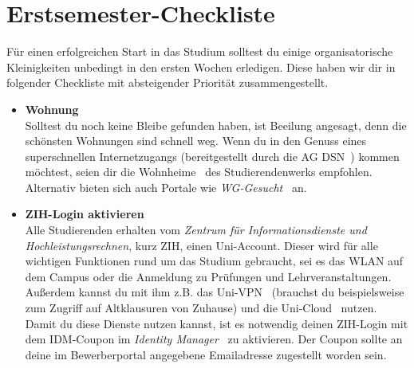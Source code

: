 \newcommand{\checkbox}[1]{\item[$\square$]\textbf{#1}\\}

\chapter*{Erstsemester-Checkliste}

Für einen erfolgreichen Start in das Studium solltest du einige organisatorische
Kleinigkeiten unbedingt in den ersten Wochen erledigen. Diese haben wir dir in
folgender Checkliste mit absteigender Priorität zusammengestellt.

\begin{itemize}[leftmargin=*]

\checkbox{Wohnung}
Solltest du noch keine Bleibe gefunden haben, ist Beeilung angesagt, denn die
schönsten Wohnungen sind schnell weg. Wenn du in den Genuss eines
superschnellen Internetzugangs (bereitgestellt durch die AG
DSN~) kommen möchtest, seien dir die
Wohnheime~
des Studierendenwerks empfohlen. Alternativ bieten sich auch Portale wie
\textit{\mbox{WG-Gesucht}}~ an.

\checkbox{ZIH-Login aktivieren}
Alle Studierenden erhalten vom \textit{Zentrum für Informationsdienste und
Hochleistungsrechnen}, kurz ZIH, einen Uni-Account. Dieser wird für alle
wichtigen Funktionen rund um das Studium gebraucht, sei es das WLAN auf dem
Campus oder die Anmeldung zu Prüfungen und Lehrveranstaltungen.
Außerdem kannst du mit ihm z.B. das Uni-VPN~
(brauchst du beispielsweise zum Zugriff auf Altklausuren von Zuhause) und die
Uni-Cloud~
nutzen.\\
Damit du diese Dienste nutzen kannst, ist es notwendig deinen ZIH-Login mit dem
IDM-Coupon im \textit{Identity Manager}~
zu aktivieren. Der Coupon sollte an deine im Bewerberportal angegebene
Emailadresse zugestellt worden sein.


\end{itemize}
